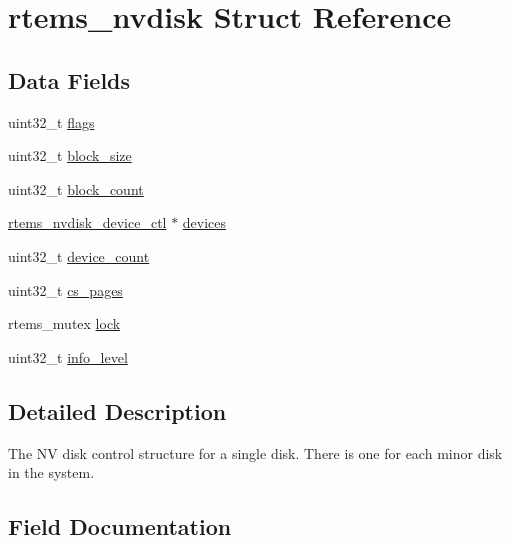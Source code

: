 \hypertarget{structrtems__nvdisk}{}\section{rtems\+\_\+nvdisk Struct Reference}
\label{structrtems__nvdisk}
\subsection*{Data Fields}
\begin{DoxyCompactItemize}
\item 
uint32\+\_\+t \mbox{\hyperlink{structrtems__nvdisk_a6739f489add6b00bea568f87a611ae35}{flags}}
\item 
uint32\+\_\+t \mbox{\hyperlink{structrtems__nvdisk_abad00232608ae01e41ff85ff4f75ac50}{block\+\_\+size}}
\item 
uint32\+\_\+t \mbox{\hyperlink{structrtems__nvdisk_a7695aec77f9f011cca612c5f238b1e61}{block\+\_\+count}}
\item 
\mbox{\hyperlink{structrtems__nvdisk__device__ctl}{rtems\+\_\+nvdisk\+\_\+device\+\_\+ctl}} $\ast$ \mbox{\hyperlink{structrtems__nvdisk_a9407f609ca924da10b14a6ec632436ac}{devices}}
\item 
uint32\+\_\+t \mbox{\hyperlink{structrtems__nvdisk_a89e0877b97f3e15890c6ae12fd19bd83}{device\+\_\+count}}
\item 
uint32\+\_\+t \mbox{\hyperlink{structrtems__nvdisk_a8e4058f06f62e71b604b8778fcb91003}{cs\+\_\+pages}}
\item 
rtems\+\_\+mutex \mbox{\hyperlink{structrtems__nvdisk_a031672b95e860c39356e721692df0bad}{lock}}
\item 
uint32\+\_\+t \mbox{\hyperlink{structrtems__nvdisk_a4f00a9bfc487f8f7052c701a343aa6bc}{info\+\_\+level}}
\end{DoxyCompactItemize}


\subsection{Detailed Description}
The NV disk control structure for a single disk. There is one for each minor disk in the system. 

\subsection{Field Documentation}
\mbox{\label{structrtems__nvdisk_a7695aec77f9f011cca612c5f238b1e61}} 
